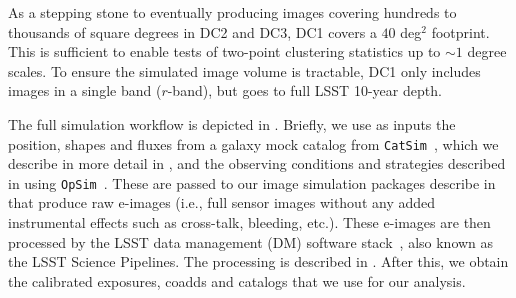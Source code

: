 \documentclass[twocolumn]{aastex62}
\newcommand{\as}[1]{{\textcolor{magenta}{{\textbf (AS: #1)}}}}
\begin{document}

As a stepping stone to eventually producing images covering hundreds to thousands of square degrees
in DC2 and DC3, DC1 covers a $40$ deg$^2$ footprint.  This is sufficient to enable tests of
two-point clustering statistics up to $\sim 1$ degree scales.  To ensure the simulated image volume is
tractable, DC1 only includes images in a single band ($r$-band), but goes to full LSST 10-year
depth. 

The full simulation workflow is depicted in . Briefly, we use as inputs the position, shapes and fluxes from a galaxy mock catalog from \texttt{CatSim}~\citep{2010SPIE.7738E..1OC,2014SPIE.9150E..14C}, which we describe in more detail in , and the observing conditions and strategies described in  using \texttt{OpSim}~\citep{2014SPIE.9150E..15D}. These are passed to our image simulation packages describe in  that produce raw e-images (i.e., full sensor images without any added instrumental effects such as cross-talk, bleeding, etc.). These e-images are then processed by the LSST data management (DM) software stack~\citep{2015arXiv151207914J}, also known as the LSST Science Pipelines. The processing is described in . After this, we obtain the calibrated exposures, coadds and catalogs that we use for our analysis.
\end{document}
